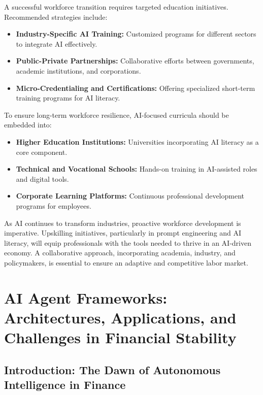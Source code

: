 \documentclass[a4paper,headinclude=on,footinclude=on,12pt,oneside]{scrbook}
\begin{document}

A successful workforce transition requires targeted education initiatives. Recommended strategies include:
\begin{itemize}
	\item \textbf{Industry-Specific AI Training:} Customized programs for different sectors to integrate AI effectively.
	\item \textbf{Public-Private Partnerships:} Collaborative efforts between governments, academic institutions, and corporations.
	\item \textbf{Micro-Credentialing and Certifications:} Offering specialized short-term training programs for AI literacy.
\end{itemize}


To ensure long-term workforce resilience, AI-focused curricula should be embedded into:
\begin{itemize}
	\item \textbf{Higher Education Institutions:} Universities incorporating AI literacy as a core component.
	\item \textbf{Technical and Vocational Schools:} Hands-on training in AI-assisted roles and digital tools.
	\item \textbf{Corporate Learning Platforms:} Continuous professional development programs for employees.
\end{itemize}


As AI continues to transform industries, proactive workforce development is imperative. Upskilling initiatives, particularly in prompt engineering and AI literacy, will equip professionals with the tools needed to thrive in an AI-driven economy. A collaborative approach, incorporating academia, industry, and policymakers, is essential to ensure an adaptive and competitive labor market.
%

\chapter{AI Agent Frameworks: Architectures, Applications, and Challenges in Financial Stability}

\section*{Introduction: The Dawn of Autonomous Intelligence in Finance}
\end{document}
